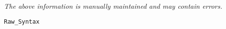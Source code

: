 \label{pkg:raw\_syntax}

{\tiny \it The above information is manually maintained and may contain errors.}
\begin{verbatim}
Raw_Syntax
\end{verbatim}
